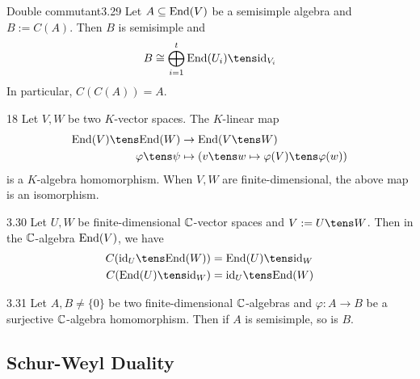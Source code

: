 \documentclass[twoside = false,	%
		headsepline,		%
		parskip = true,
		]{scrbook}						%
\begin{document}
        \begin{theorem}{Double commutant}{3.29}
            Let $A \subseteq \mathrm{End}(V)$ be a semisimple algebra and $B:=C(A)$. Then $B$ is semisimple and
            \begin{equation*}
                B \cong \bigoplus_{i=1}^t \End(U_i) \tens \id_{V_i}
            \end{equation*}
            In particular, $C(C(A)) = A$.
        \end{theorem}

        \begin{exercise}{}{18}
            Let $V, W$ be two $K$-vector spaces. The $K$-linear map
            \begin{equation*}
            \begin{split}
                \End(V) \tens \End(W) &\to \End(V \tens W) \\
                    \varphi \tens \psi &\mapsto (v \tens w \mapsto \varphi(V) \tens \varphi(w))
            \end{split}
            \end{equation*}
            is a $K$-algebra homomorphism. When $V,W$ are finite-dimensional, the above map is an isomorphism.
        \end{exercise}

        \begin{lemma}{}{3.30}
            Let $U,W$ be finite-dimensional $\mathbb C$-vector spaces and $V:= U \tens W$. Then in the $\mathbb C$-algebra $\mathrm{End}(V)$, we have
            \begin{equation*}
            \begin{split}
                C(\id_U \tens \End(W)) &= \End(U) \tens \id_W \\
                C(\End(U) \tens \id_W) &= \id_U \tens \End(W)
            \end{split}
            \end{equation*}
        \end{lemma}


        \begin{proposition}{}{3.31}
            Let $A,B \neq \{0\}$ be two finite-dimensional $\mathbb C$-algebras and $\varphi: A \to B$ be a surjective $\mathbb C$-algebra homomorphism. Then if $A$ is semisimple, so is $B$. 
        \end{proposition}

    \subsection{Schur-Weyl Duality}
\end{document}
